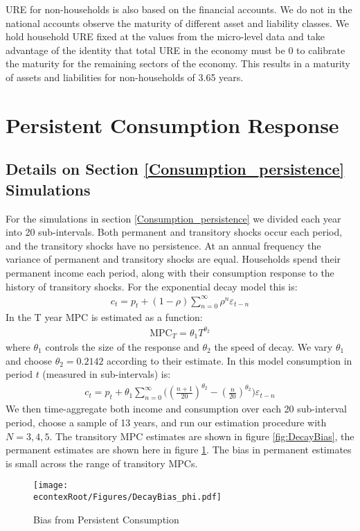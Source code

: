 \documentclass[titlepage]{\econtex}\newcommand{\texname}{ConsumptionHeterogeneity}
\begin{document}
URE for non-households is also based on the financial accounts. We do not in the national accounts observe the maturity of different asset and liability classes. We hold household URE fixed at the values from the micro-level data and take advantage of the identity that total URE in the economy must be 0 to calibrate the maturity for the remaining sectors of the economy. This results in a maturity of assets and liabilities for non-households of 3.65 years.

\section{Persistent Consumption Response} \label{consumption_persistence_appendix}
\setcounter{figure}{0}   
\setcounter{table}{0} 
\subsection{Details on Section \ref{Consumption_persistence} Simulations}
For the simulations in section \ref{Consumption_persistence} we divided each year into 20 sub-intervals. Both permanent and transitory shocks occur each period, and the transitory shocks have no persistence. At an annual frequency the variance of permanent and transitory shocks are equal. Households spend their permanent income each period, along with their consumption response to the history of transitory shocks. For the exponential decay model this is:
\begin{align*}
c_t = p_t + (1-\rho)\sum_{n=0}^{\infty}\rho^n \varepsilon_{t-n}
\end{align*}
In \cite{fagereng_mpc_2016} the T year MPC is estimated as a function:
\begin{align*}
\text{MPC}_T = \theta_1 T^{\theta_2}
\end{align*}
where $\theta_1$ controls the size of the response and $\theta_2$ the speed of decay. We vary $\theta_1$ and choose $\theta_2= 0.2142$ according to their estimate. In this model consumption in period $t$ (measured in sub-intervals) is:
\begin{align*}
c_t = p_t + \theta_1\sum_{n=0}^{\infty}\Big( (\frac{n+1}{20})^{\theta_2} -(\frac{n}{20})^{\theta_2} \Big)\varepsilon_{t-n}
\end{align*}
We then time-aggregate both income and consumption over each 20 sub-interval period, choose a sample of 13 years, and run our estimation procedure with $N=3,4,5$. The transitory MPC estimates are shown in figure \ref{fig:DecayBias}, the permanent estimates are shown here in figure \ref{fig:DecayBias_phi}. The bias in permanent estimates is small across the range of transitory MPCs.
\begin{figure} 
	\begin{centering}
		\texttt{[image: \\econtexRoot/Figures/DecayBias\_phi.pdf]}
		\caption{Bias from Persistent Consumption}
		\label{fig:DecayBias_phi}
	\end{centering}
\end{figure}
\end{document}
